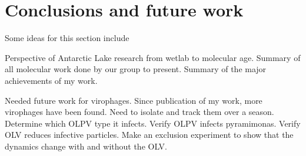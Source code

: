 \chapter{Conclusions and future work}
\label{ch:conc}
Some ideas for this section include


Perspective of Antarctic Lake research from wetlab to molecular age.
Summary of all molecular work done by our group to present.
Summary of the major achievements of my work.

Needed future work for virophages. Since publication of my work, more virophages have been found. 
Need to isolate and track them over a season.
Determine which OLPV type it infects.
Verify OLPV infects pyramimonas.
Verify OLV reduces infective particles.
Make an exclusion experiment to show that the dynamics change with and without
the OLV. 


 
